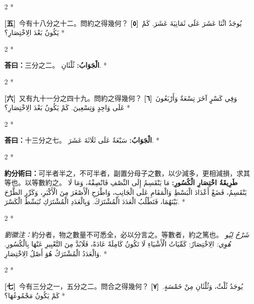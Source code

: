 \documentclass[11pt,a4paper]{article}
\newcommand{\ar}[1]{\arabicfont\beginR #1\endR}
\newcommand{\problemnum}[1]{\textbf{[\ignorespaces#1\unskip]}}
\newenvironment{bilingual}{%
  \begin{paracol}{2}%
  \switchcolumn[0]*%
}{%
  \end{paracol}%
}
\newcommand{\cnline}[1]{\switchcolumn[0]\noindent #1 \switchcolumn[1]}
\newcommand{\arline}[1]{\noindent\ar{#1} \switchcolumn[0]*}
\newenvironment{prob bilingual}{%
  \begin{paracol}{2}%
  \switchcolumn[0]*%
}{%
  \end{paracol}%
  \vspace{0.3em}%
}
\begin{document}
\begin{bilingual}
\cnline{\problemnum{五}\, 今有十八分之十二。問約之得幾何？}
\arline{\problemnum{٥}\, يُوجَدُ اثْنَا عَشَرَ عَلَى ثَمَانِيَةَ عَشَرَ. كَمْ يَكُونُ بَعْدَ الِاخْتِصَارِ؟}
\end{bilingual}

\begin{bilingual}
\cnline{\textcolor{answercolor}{\textbf{荅曰：}}三分之二。}
\arline{\textcolor{answercolor}{\textbf{الْجَوَابُ:}} ثُلْثَانِ.
}
\end{bilingual}

\begin{bilingual}
\cnline{\problemnum{六}\, 又有九十一分之四十九。問約之得幾何？}
\arline{\problemnum{٦}\, وَفِي كَسْرٍ آخَرَ تِسْعَةٌ وَأَرْبَعُونَ عَلَى وَاحِدٍ وَتِسْعِينَ. كَمْ يَكُونُ بَعْدَ الِاخْتِصَارِ؟}
\end{bilingual}

\begin{bilingual}
\cnline{\textcolor{answercolor}{\textbf{荅曰：}}十三分之七。}
\arline{\textcolor{answercolor}{\textbf{الْجَوَابُ:}} سَبْعَةٌ عَلَى ثَلَاثَةَ عَشَرَ.}
\end{bilingual}

\begin{bilingual}
\cnline{%
\textcolor{methodcolor}{\textbf{約分術曰：}}可半者半之，不可半者，副置分母子之數，以少減多，更相減損，求其等也。以等數約之。
}
\arline{%
\textcolor{methodcolor}{\textbf{طَرِيقَةُ اخْتِصَارِ الْكُسُورِ:}} مَا يَنْقَسِمُ إِلَى النِّصْفِ فَانْصِفْهُ، وَمَا لَا يَنْقَسِمُ، فَضَعْ أَعْدَادَ الْبَسْطِ وَالْمَقَامِ عَلَى الْجَانِبِ، وَاطْرَحِ الْأَصْغَرَ مِنَ الْأَكْبَرِ، وَكَرِّرِ الطَّرْحَ بَيْنَهُمَا، فَتَطْلُبُ الْعَدَدَ الْمُشْتَرَكَ. وَبِالْعَدَدِ الْمُشْتَرَكِ تُبَسِّطُ الْكَسْرَ.
}
\end{bilingual}

\begin{bilingual}
\cnline{%
\textcolor{commentarycolor}{\small\textit{劉徽注：}}約分者，物之數量不可悉全，必以分言之。等數者，約之篤也。
}
\arline{%
\textcolor{commentarycolor}{\small\textit{شَرْحُ لِيُو هُوِي:}} الِاخْتِصَارُ: كَمِّيَاتُ الْأَشْيَاءِ لَا تَكُونُ كَامِلَةً عَادَةً، فَلَابُدَّ مِنَ التَّعْبِيرِ عَنْهَا بِالْكُسُورِ. وَالْعَدَدُ الْمُشْتَرَكُ هُوَ أَصْلُ الِاخْتِصَارِ.
}
\end{bilingual}

\begin{bilingual}
\cnline{\problemnum{七}\, 今有三分之一，五分之二。問合之得幾何？}
\arline{\problemnum{٧}\, يُوجَدُ ثُلْثٌ، وَثُلْثَانِ مِنْ خَمْسَةٍ. كَمْ يَكُونُ مَجْمُوعُهَا؟}
\end{bilingual}
\end{document}
